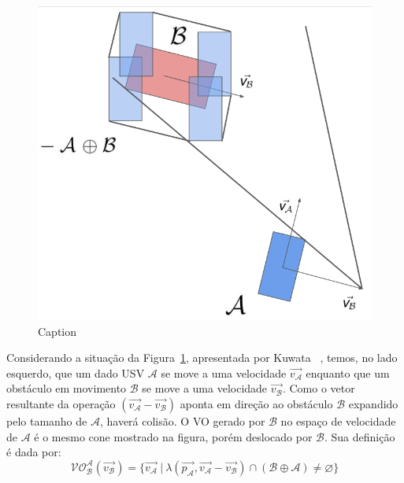         \begin{figure}
            \centering
            \includegraphics[width=\textwidth]{fig/chap2/vo.png}
            \caption{Caption}
            \label{fig:Kuwata2014_vo}
        \end{figure}
        Considerando a situação da Figura~\ref{fig:Kuwata2014_vo}, apresentada por Kuwata \etal~\cite{KUWATA2014110}, temos, no lado esquerdo, que um dado USV $\mathcal{A}$ se move a uma velocidade $\vec{v_\mathcal{A}}$ enquanto que um obstáculo em movimento $\mathcal{B}$ se move a uma velocidade $\vec{v_\mathcal{B}}$. Como o vetor resultante da operação $(\vec{v_\mathcal{A}} - \vec{v_\mathcal{B}})$ aponta em direção ao obstáculo $\mathcal{B}$ expandido pelo tamanho de $\mathcal{A}$, haverá colisão. O VO gerado por $\mathcal{B}$ no espaço de velocidade de $\mathcal{A}$ é o mesmo cone mostrado na figura, porém deslocado por $\mathcal{B}$. Sua definição é dada por:
        \begin{equation}\label{eq:velocityObstacle}
            \mathcal{VO^A_B}(\vec{v_\mathcal{B}}) = \{\vec{v_\mathcal{A}}~|~\lambda(\vec{p_\mathcal{A}}, \vec{v_\mathcal{A}} - \vec{v_\mathcal{B}}) \cap (\mathcal{B} \oplus \mathcal{A}) \neq \varnothing\}
        \end{equation}